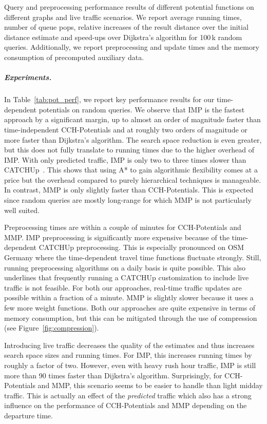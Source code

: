 \documentclass[a4paper,UKenglish,cleveref, autoref, thm-restate,anonymous]{lipics-v2021}
\begin{document}
\begin{table}
\centering
\caption{
Query and preprocessing performance results of different potential functions on different graphs and live traffic scenarios.
We report average running times, number of queue pops, relative increases of the result distance over the initial distance estimate and speed-ups over Dijkstra's algorithm for 100\,k random queries.
Additionally, we report preprocessing and update times and the memory consumption of precomputed auxiliary data.
}\label{tab:pot_perf}

\end{table}

\subparagraph{Experiments.} In Table~\ref{tab:pot_perf}, we report key performance results for our time-dependent potentials on random queries.
We observe that IMP is the fastest approach by a significant margin, up to almost an order of magnitude faster than time-independent CCH-Potentials and at roughly two orders of magnitude or more faster than Dijkstra's algorithm.
The search space reduction is even greater, but this does not fully translate to running times due to the higher overhead of IMP.
With only predicted traffic, IMP is only two to three times slower than CATCHUp~\cite{swz-sfert-21}.
This shows that using A* to gain algorithmic flexibility comes at a price but the overhead compared to purely hierarchical techniques is manageable.
In contrast, MMP is only slightly faster than CCH-Potentials.
This is expected since random queries are mostly long-range for which MMP is not particularly well suited.

Preprocessing times are within a couple of minutes for CCH-Potentials and MMP.
IMP preprocessing is significantly more expensive because of the time-dependent CATCHUp preprocessing.
This is especially pronounced on OSM Germany where the time-dependent travel time functions fluctuate strongly.
Still, running preprocessing algorithms on a daily basis is quite possible.
This also underlines that frequently running a CATCHUp customization to include live traffic is not feasible.
For both our approaches, real-time traffic updates are possible within a fraction of a minute.
MMP is slightly slower because it uses a few more weight functions.
Both our approaches are quite expensive in terms of memory consumption, but this can be mitigated through the use of compression (see Figure~\ref{fig:compression}).

Introducing live traffic decreases the quality of the estimates and thus increases search space sizes and running times.
For IMP, this increases running times by roughly a factor of two.
However, even with heavy rush hour traffic, IMP is still more than 90 times faster than Dijkstra's algorithm.
Surprisingly, for CCH-Potentials and MMP, this scenario seems to be easier to handle than light midday traffic.
This is actually an effect of the \emph{predicted} traffic which also has a strong influence on the performance of CCH-Potentials and MMP depending on the departure time.
\end{document}
